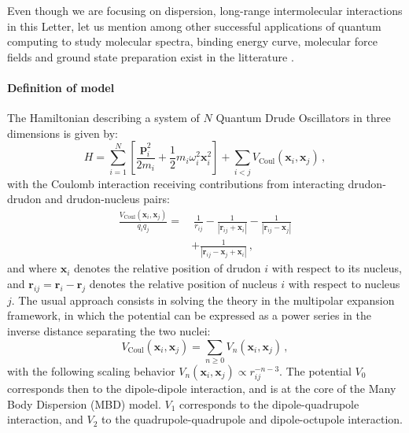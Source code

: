 \documentclass[reprint, amsmath, amssymb, floatfix, aps, pra]{revtex4-2}
\begin{document}
    Even though we are focusing on dispersion, long-range intermolecular interactions in this Letter, let us mention among other successful applications of quantum computing to study molecular spectra, binding energy curve, molecular force fields and ground state preparation exist in the litterature \cite{kiss2022quantum, apanavicius2021morse, wang2009efficient, nam2020ground, romero2018strategies, colless2018computation, kandala2017hardware}.
    \newline
\paragraph*{Definition of model}

        The Hamiltonian describing a system of $N$ Quantum Drude Oscillators in three dimensions is given by:
        \begin{equation*}
            H=\sum_{i=1}^N\left[\frac{\bm{p} _i^2}{2m_i} + \frac{1}{2}m_i\omega_i^2\bm{x} _i^2\right] +\sum_{i<j}V_\text{Coul}\left(\bm{x} _i, \bm{x} _j\right)\,,
        \end{equation*}
        with the Coulomb interaction receiving contributions from interacting drudon-drudon and drudon-nucleus pairs:
        \begin{equation*}
        \begin{split}
            \frac{V_\text{Coul}\left(\bm{x} _i, \bm{x} _j\right)}{q_iq_j}=&\ \frac{1}{r_{ij}} - \frac{1}{|\bm{r}_{ij}
            + \bm{x} _i|} - \frac{1}{|\bm{r}_{ij}  - \bm{x} _j|} \\
            & + \frac{1}{|\bm{r}_{ij} - \bm{x} _j + \bm{x} _i|}\,,
        \end{split}
        \end{equation*}
        and where $\bm x_i$ denotes the relative position of drudon $i$ with respect to its nucleus, and $\bm r_{ij}=\bm r_i - \bm r_j$ denotes the relative position of nucleus $i$ with respect to nucleus $j$. The usual approach consists in solving the theory in the multipolar expansion framework, in which the potential can be expressed as a power series in the inverse distance separating the two nuclei:
        \begin{equation*}
            V_\text{Coul}\left(\bm{x} _i, \bm{x} _j\right)= \sum_{n\geq 0} V_n\left(\bm{x} _i, \bm{x} _j\right)\,,
        \end{equation*}
        with the following scaling behavior $V_n\left(\bm{x} _i, \bm{x} _j\right)\propto r_{ij}^{-n-3}$.
        The potential $V_0$ corresponds then to the dipole-dipole interaction, and is at the core of the Many Body Dispersion (MBD) model. $V_1$ corresponds to the dipole-quadrupole interaction, and $V_2$ to the quadrupole-quadrupole and dipole-octupole interaction.
\end{document}
